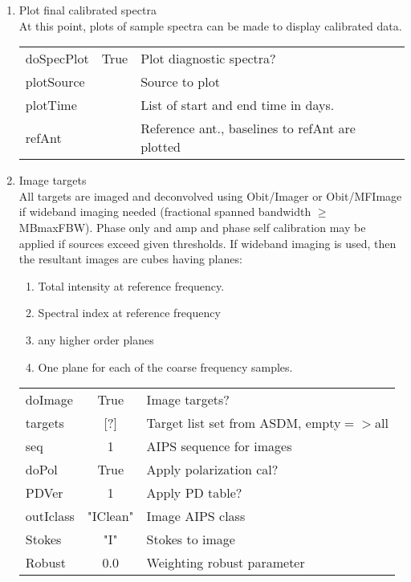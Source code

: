 \documentclass[11pt]{article}
\begin{document}
\begin{enumerate}
\begin{center}
\begin{tabular}{|l|c|l|}
\hline
\end{tabular}
\end{center}
%
\item Plot final calibrated spectra\\
At this point, plots of sample spectra can be made to display
calibrated data.
\begin{center}
\begin{tabular}{|l|c|l|}
\hline
doSpecPlot     & True &  Plot diagnostic spectra?\\
plotSource     &      & Source to plot\\
plotTime       &      & List of start and end time in days.\\
refAnt         &      & Reference ant., baselines to refAnt are plotted \\
\hline
\end{tabular}
\end{center}
%
\item Image targets \\
All targets are imaged and deconvolved using Obit/Imager or
Obit/MFImage if wideband imaging needed (fractional spanned bandwidth
$\ge$ MBmaxFBW).
Phase only and amp and phase self calibration may be applied if sources
exceed given thresholds.
If wideband imaging is used, then the resultant images are cubes
having planes:
\begin{enumerate}
\item Total intensity at reference frequency.
\item Spectral index at reference frequency
\item any higher order planes
\item One plane for each of the coarse frequency samples.
\end{enumerate}
\begin{center}
\begin{tabular}{|l|c|l|}
\hline
doImage     & True     & Image targets? \\
targets     & [?]       & Target list set from ASDM, empty$=>$all\\
seq         & 1        & AIPS sequence for images \\
doPol       & True     & Apply polarization cal?\\
PDVer       &  1       & Apply PD table?\\
outIclass   & "IClean" & Image AIPS class\\
Stokes      & "I"      & Stokes to image \\
Robust      & 0.0      & Weighting robust parameter\\

\end{tabular}
\end{center}
\end{enumerate}
\end{document}
